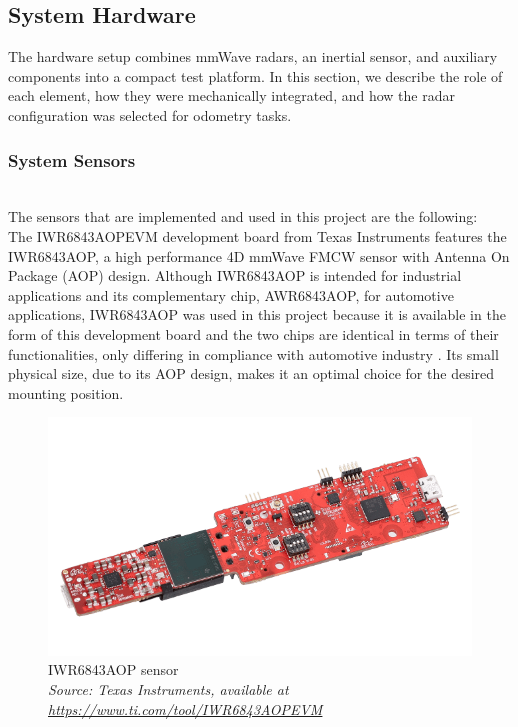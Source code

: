 \subsection{System Hardware}

The hardware setup combines mmWave radars, an inertial sensor, and auxiliary components into a compact test platform.  
In this section, we describe the role of each element, how they were mechanically integrated, and how the radar configuration was selected for odometry tasks.  

\vspace{0.5em}
\subsubsection{System Sensors}
\hfill
\\
The sensors that are implemented and used in this project are the following:
\vspace{0.5em}
\hfill
\\
\indent The IWR6843AOPEVM development board from Texas Instruments features the IWR6843AOP, a high performance 4D mmWave FMCW sensor with Antenna On Package (AOP) design.
Although IWR6843AOP is intended for industrial applications and its complementary chip, AWR6843AOP, for automotive applications, IWR6843AOP was used in this project because it is available in the form of this development board and the two chips are identical in terms of their functionalities, only differing in compliance with automotive  industry \cite{iwr_awr_diff}.
Its small physical size, due to its AOP design, makes it an optimal choice for the desired mounting position.
\begin{figure}[!htbp]
    \centering
    \includegraphics[width=0.7\linewidth]{images/iwr6843aopevm-angled.png}
    \caption{IWR6843AOP sensor\\
    \textit{Source: Texas Instruments, available at \href {https://www.ti.com/content/dam/ticom/images/products/ic/processors/evm-boards/iwr6843aopevm-angled.png}{https://www.ti.com/tool/IWR6843AOPEVM}}}
    \label{fig:IWR6843AOP sensor}
\end{figure}

